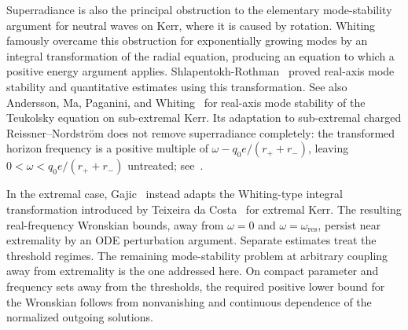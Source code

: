 \documentclass[11pt]{article}
\numberwithin{equation}{section}
\begin{document}
	Superradiance is also the principal obstruction to the elementary
	mode-stability argument for neutral waves on Kerr, where it is caused
	by rotation. Whiting~\cite{Whiting1989} famously overcame this obstruction
	for exponentially growing modes by an integral transformation of
	the radial equation, producing an equation to which a positive
	energy argument applies. Shlapentokh-Rothman~\cite{ShlapentokhRothman2015}
	proved real-axis mode stability and quantitative estimates using
	this transformation. {See also Andersson, Ma, Paganini, and Whiting~\cite{AnderssonMaPaganiniWhiting2017} for real-axis mode stability of the Teukolsky equation on sub-extremal Kerr.} Its adaptation to sub-extremal charged
	Reissner--Nordstr\"om does not remove superradiance completely:
	the transformed horizon frequency is a positive multiple of
	$\omega-q_0e/(r_++r_-)$, leaving
	$0<\omega<q_0e/(r_++r_-)$ untreated;
	see~\cite[Appendix~B]{Gajic2026I}.
	
	In the extremal case, Gajic~\cite[Theorem~7.14]{Gajic2026I}
	instead adapts the Whiting-type integral transformation introduced
	by Teixeira da Costa~\cite{TeixeiraDaCosta2020} for extremal Kerr.
	The resulting real-frequency Wronskian bounds, away from
	$\omega=0$ and $\omega=\omega_{\mathrm{res}}$, persist near
	extremality by an ODE perturbation argument. Separate estimates
	treat the threshold regimes. The remaining mode-stability problem
	at arbitrary coupling away from extremality is the one addressed
	here. On compact parameter and frequency sets away from the
	thresholds, the required positive lower bound for the Wronskian
	follows from nonvanishing and continuous dependence of the
	normalized outgoing solutions.
	
\end{document}
